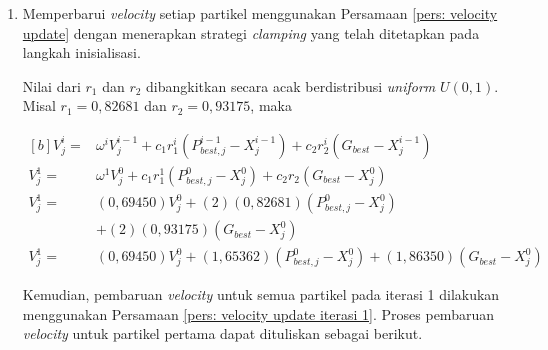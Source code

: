{{\begin{enumerate}[align = left, left = 0cm, nolistsep]
              Sehingga diperoleh nilai \textit{inertia weight} untuk iterasi ke-$1$ sebesar $0,69450$.
              Nilai \textit{inertia weight} selalu dibangkitkan di setiap iterasi menggunakan nilai $r$ acak berdistribusi \textit{uniform} $U(0,1)$.

        \item Memperbarui \textit{velocity} setiap partikel menggunakan Persamaan \ref{pers: velocity update} dengan menerapkan strategi \textit{clamping} yang telah ditetapkan pada langkah inisialisasi. \par \nobreak
              Nilai dari $r_{1}$ dan $r_{2}$ dibangkitkan secara acak berdistribusi \textit{uniform} $U(0,1)$. \newline
              Misal $r_{1} = 0,82681$ dan $r_{2} = 0,93175$, maka

                  {%
                      \begin{equation}
                          \label{pers: velocity update iterasi 1}
                          \begin{aligned}[b]
                              V_{j}^{i}  = & \omega^{i}V_{j}^{i-1} + c_{1}r_{1}^{i}\left(P_{best,j}^{i-1}-X_{j}^{i-1}\right) + c_{2}r_{2}^{i}\left(G_{best}-X_{j}^{i-1}\right) & \\
                              V_{j}^{1}  = & \omega^{1}V_{j}^{0} + c_{1}r_{1}^{1}\left(P_{best,j}^{0}-X_{j}^{0}\right) + c_{2}r_{2}\left(G_{best}-X_{j}^{0}\right)             & \\
                              V_{j}^{1}  = & (0,69450)V_{j}^{0} + (2)(0,82681)\left(P_{best,j}^{0}-X_{j}^{0}\right)                                                            & \\
                                           & + (2)(0,93175)\left(G_{best}-X_{j}^{0}\right)                                                                                     & \\
                              V_{j}^{1}  = & (0,69450)V_{j}^{0} + (1,65362)\left(P_{best,j}^{0}-X_{j}^{0}\right) + (1,86350)\left(G_{best}-X_{j}^{0}\right)                    &
                          \end{aligned}
                      \end{equation}
                  }

              Kemudian, pembaruan \textit{velocity} untuk semua partikel pada iterasi 1 dilakukan menggunakan Persamaan \ref{pers: velocity update iterasi 1}.
              Proses pembaruan \textit{velocity} untuk partikel pertama dapat dituliskan sebagai berikut.


\end{enumerate}}}
